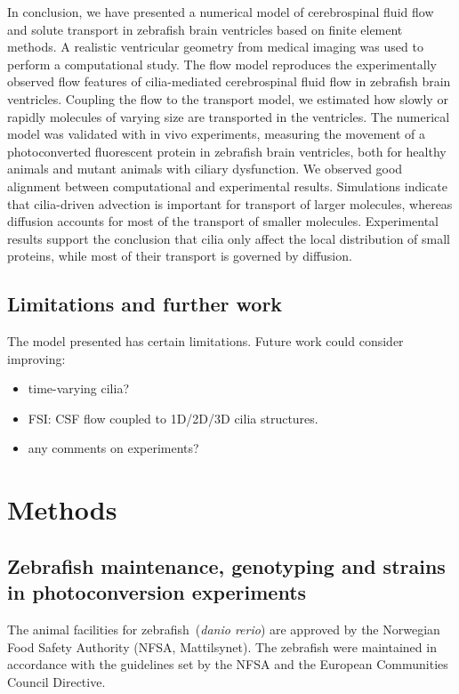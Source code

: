 \documentclass{WileyMSP-template}
\begin{document}
In conclusion, we have presented a numerical model
of cerebrospinal fluid flow and solute transport in
zebrafish brain ventricles based on finite element methods.
A realistic ventricular geometry from medical imaging was used to perform a
computational study. The flow model reproduces
the experimentally observed flow features of cilia-mediated cerebrospinal fluid
flow in zebrafish brain ventricles. Coupling the flow to the transport model,
we estimated how slowly or rapidly molecules of varying size are transported in
the ventricles. 
The numerical model was validated with in vivo experiments, measuring the movement of
a photoconverted fluorescent protein in zebrafish brain ventricles,
both for healthy animals and mutant animals with ciliary dysfunction.
We observed good alignment between computational and experimental results.
Simulations indicate that cilia-driven advection is important
for transport of larger molecules, whereas diffusion accounts for most of
the transport of smaller molecules. 
Experimental results support the conclusion that cilia only affect the
local distribution of small proteins,
while most of their transport is governed by diffusion. 

\subsection{Limitations and further work}
The model presented has certain limitations. Future work could consider improving:
\begin{itemize}
    \item time-varying cilia?
    \item FSI: CSF flow coupled to 1D/2D/3D cilia structures.
    \item any comments on experiments?
\end{itemize}

\section{Methods}

\subsection{Zebrafish maintenance, genotyping and strains in photoconversion experiments}
The animal facilities for zebrafish~(\emph{danio rerio}) are approved by the
Norwegian Food Safety Authority (NFSA, Mattilsynet).
The zebrafish were maintained in accordance with the guidelines set by the
NFSA and the European Communities Council Directive.
\end{document}
